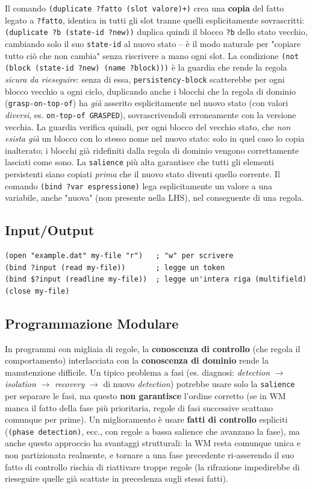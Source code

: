 \documentclass[a4paper,11pt]{article}
\begin{document}
Il comando \texttt{(duplicate ?fatto (slot valore)+)} crea una \textbf{copia} del fatto legato a \texttt{?fatto}, identica in tutti gli slot tranne quelli esplicitamente sovrascritti: \texttt{(duplicate ?b (state-id ?new))} duplica quindi il blocco \texttt{?b} dello stato vecchio, cambiando solo il suo \texttt{state-id} al nuovo stato -- è il modo naturale per "copiare tutto ciò che non cambia" senza riscrivere a mano ogni slot. La condizione \texttt{(not (block (state-id ?new) (name ?block)))} è la guardia che rende la regola \emph{sicura da rieseguire}: senza di essa, \texttt{persistency-block} scatterebbe per ogni blocco vecchio a ogni ciclo, duplicando anche i blocchi che la regola di dominio (\texttt{grasp-on-top-of}) ha \emph{già} asserito esplicitamente nel nuovo stato (con valori \emph{diversi}, es. \texttt{on-top-of GRASPED}), sovrascrivendoli erroneamente con la versione vecchia. La guardia verifica quindi, per ogni blocco del vecchio stato, che \emph{non esista già} un blocco con lo stesso nome nel nuovo stato: solo in quel caso lo copia inalterato; i blocchi già ridefiniti dalla regola di dominio vengono correttamente lasciati come sono. La \texttt{salience} più alta garantisce che tutti gli elementi persistenti siano copiati \emph{prima} che il nuovo stato diventi quello corrente. Il comando \texttt{(bind ?var espressione)} lega esplicitamente un valore a una variabile, anche "nuova" (non presente nella LHS), nel conseguente di una regola.

\subsection{Input/Output}

\begin{lstlisting}
(open "example.dat" my-file "r")   ; "w" per scrivere
(bind ?input (read my-file))       ; legge un token
(bind $?input (readline my-file))  ; legge un'intera riga (multifield)
(close my-file)
\end{lstlisting}

\subsection{Programmazione Modulare}

In programmi con migliaia di regole, la \textbf{conoscenza di controllo} (che regola il comportamento) interlacciata con la \textbf{conoscenza di dominio} rende la manutenzione difficile. Un tipico problema a fasi (es. diagnosi: \emph{detection} $\to$ \emph{isolation} $\to$ \emph{recovery} $\to$ di nuovo \emph{detection}) potrebbe usare solo la \texttt{salience} per separare le fasi, ma questo \textbf{non garantisce} l'ordine corretto (se in WM manca il fatto della fase più prioritaria, regole di fasi successive scattano comunque per prime). Un miglioramento è usare \textbf{fatti di controllo} espliciti (\texttt{(phase detection)}, ecc., con regole a bassa salience che avanzano la fase), ma anche questo approccio ha svantaggi strutturali: la WM resta comunque unica e non partizionata realmente, e tornare a una fase precedente ri-asserendo il suo fatto di controllo rischia di riattivare troppe regole (la rifrazione impedirebbe di rieseguire quelle già scattate in precedenza sugli stessi fatti).
\end{document}
